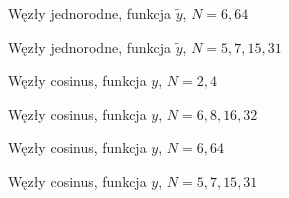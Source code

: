 \documentclass[a4paper,11pt]{article}
\begin{document}
\begin{figure}[h]
    \begin{center}
                
    \end{center}
    \caption{Węzły jednorodne, funkcja \(\tilde{y}\), \(N=6,64\)}
\end{figure}

\begin{figure}[h]
    \begin{center}
                
    \end{center}
    \caption{Węzły jednorodne, funkcja \(\tilde{y}\), \(N=5,7,15,31\)}
\end{figure}





\begin{figure}[h]
    \begin{center}
                
    \end{center}
    \caption{Węzły cosinus, funkcja \(y\), \(N=2,4\)}
\end{figure}

\begin{figure}[h]
    \begin{center}
                
    \end{center}
    \caption{Węzły cosinus, funkcja \(y\), \(N=6,8,16,32\)}
\end{figure}

\begin{figure}[h]
    \begin{center}
                
    \end{center}
    \caption{Węzły cosinus, funkcja \(y\), \(N=6,64\)}
\end{figure}

\begin{figure}[h]
    \begin{center}
                
    \end{center}
    \caption{Węzły cosinus, funkcja \(y\), \(N=5,7,15,31\)}
\end{figure}

\end{document}
